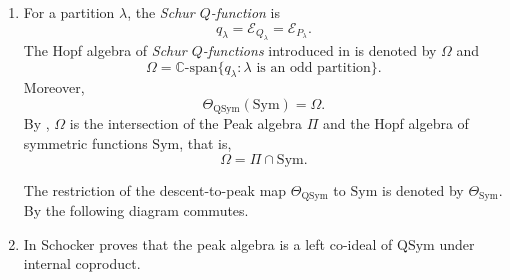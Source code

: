 \documentclass[11pt]{amsart}
\numberwithin{equation}{section}
\newcommand{\QSym}{\mathrm{QSym}}
\newcommand{\Sym}{\mathrm{Sym}}
\newcommand{\scrX}{{\mathscr{X}}}
\newcommand{\scrE}{{\mathscr{E}}}
\begin{document}
\begin{enumerate}[leftmargin=*]
\item For a partition $\lambda$, the \emph{Schur $Q$-function} is 
$$q_\lambda=\scrE_{Q_{\lambda}}=\scrE_{P_{\lambda}}.$$ The Hopf algebra of \emph{Schur $Q$-functions} introduced in \cite{S11} is denoted by $\Omega$ and 
$$\Omega=\mathbb{C}\text{-span}\{q_\lambda: \lambda \text{~is an odd partition}\}.$$
Moreover, 
$$\Theta_{\QSym}(\Sym)=\Omega.$$
 By \cite[Theorem 3.8]{S97}, $\Omega$ is the intersection of the Peak algebra $\Pi$ and the Hopf algebra of symmetric functions $\Sym$, that is, 
$$\Omega=\Pi\cap \Sym.$$



 The restriction of the descent-to-peak map $\Theta_{\QSym}$ to $\Sym$ is denoted by $\Theta_\Sym$. By \cite[Theorem 3.1]{S97} the following diagram commutes.
\begin{center}
\end{center}



\item   In \cite{S11} Schocker proves that the peak algebra is a left co-ideal of $\QSym$ under internal coproduct.


\end{enumerate} 	
\end{document}
